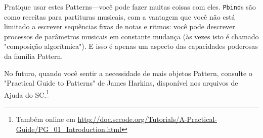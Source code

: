 Pratique usar estes Patterns---você pode fazer muitas coisas com eles. \texttt{Pbind}s são como receitas para partituras musicais, com a vantagem que você não está limitado a escrever sequências fixas de notas e ritmos: você pode descrever processos de parâmetros musicais em constante mudança (às vezes isto é chamado "composição algorítmica"). E isso é apenas um aspecto das capacidades poderosas da família Pattern.

No futuro, quando você sentir a necessidade de mais objetos Pattern, consulte o "Practical Guide to Patterns" de James Harkins, disponível nos arquivos de Ajuda do SC.\footnote{Também online em \url{http://doc.sccode.org/Tutorials/A-Practical-Guide/PG_01_Introduction.html}}

